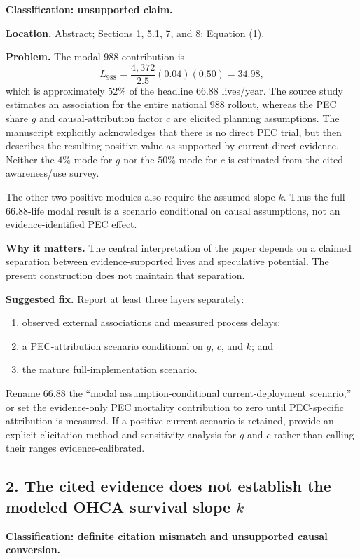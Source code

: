 \documentclass[11pt]{article}
\begin{document}
\textbf{Classification: unsupported claim.}

\textbf{Location.} Abstract; Sections 1, 5.1, 7, and 8; Equation (1).

\textbf{Problem.} The modal 988 contribution is
\[
L_{988}=\frac{4{,}372}{2.5}(0.04)(0.50)=34.98,
\]
which is approximately $52\%$ of the headline $66.88$ lives/year.  The source
study estimates an association for the entire national 988 rollout, whereas
the PEC share $g$ and causal-attribution factor $c$ are elicited planning
assumptions.  The manuscript explicitly acknowledges that there is no direct
PEC trial, but then describes the resulting positive value as supported by
current direct evidence.  Neither the $4\%$ mode for $g$ nor the $50\%$ mode
for $c$ is estimated from the cited awareness/use survey.

The other two positive modules also require the assumed slope $k$.  Thus the
full $66.88$-life modal result is a scenario conditional on causal assumptions,
not an evidence-identified PEC effect.

\textbf{Why it matters.} The central interpretation of the paper depends on a
claimed separation between evidence-supported lives and speculative potential.
The present construction does not maintain that separation.

\textbf{Suggested fix.} Report at least three layers separately:
\begin{enumerate}
\item observed external associations and measured process delays;
\item a PEC-attribution scenario conditional on $g$, $c$, and $k$; and
\item the mature full-implementation scenario.
\end{enumerate}
Rename $66.88$ the ``modal assumption-conditional current-deployment
scenario,'' or set the evidence-only PEC mortality contribution to zero until
PEC-specific attribution is measured.  If a positive current scenario is
retained, provide an explicit elicitation method and sensitivity analysis for
$g$ and $c$ rather than calling their ranges evidence-calibrated.

\subsection*{2. The cited evidence does not establish the modeled OHCA survival slope $k$}

\textbf{Classification: definite citation mismatch and unsupported causal
conversion.}
\end{document}
